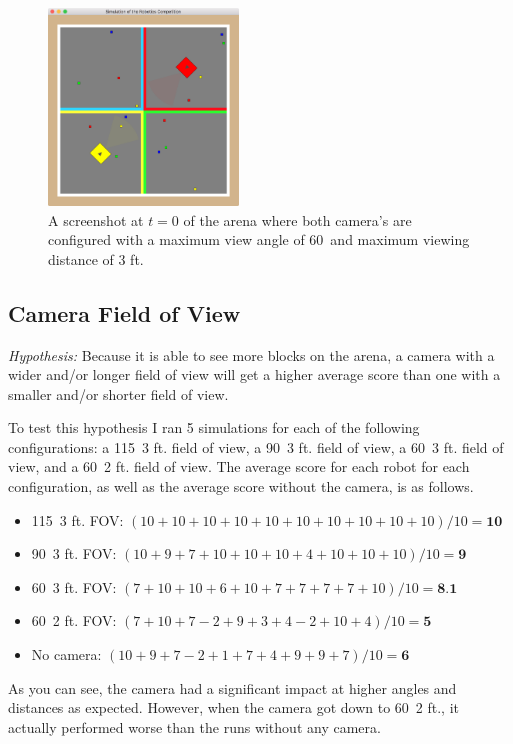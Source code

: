 \documentclass[12pt]{article}
\begin{document}
\begin{figure}[hbt]
  \center
  \includegraphics[width=0.45\textwidth]{images/arena-2.png}
  \caption{A screenshot at $t=0$ of the arena where both camera's are configured with a maximum view angle of 60\degree\ and maximum viewing distance of 3 ft.}
  \label{fig:arena-2}
\end{figure}

\subsection{Camera Field of View}
\textit{Hypothesis:} Because it is able to see more blocks on the arena, a camera with a wider and/or longer field of view will get a higher average score than one with a smaller and/or shorter field of view.

To test this hypothesis I ran 5 simulations for each of the following configurations: a 115\degree\ 3 ft. field of view, a 90\degree\ 3 ft. field of view, a 60\degree\ 3 ft. field of view, and a 60\degree\ 2 ft. field of view. The average score for each robot for each configuration, as well as the average score without the camera, is as follows.
\begin{itemize}
  \item 115\degree\ 3 ft. FOV: $(10+10+10+10+10+10+10+10+10+10)/10 = \textbf{10}$
  \item 90\degree\ 3 ft. FOV: $(10+9+7+10+10+10+4+10+10+10)/10 = \textbf{9}$
  \item 60\degree\ 3 ft. FOV: $(7+10+10+6+10+7+7+7+7+10)/10 = \textbf{8.1}$
  \item 60\degree\ 2 ft. FOV: $(7+10+7-2+9+3+4-2+10+4)/10 = \textbf{5}$
  \item No camera: $(10+9+7-2+1+7+4+9+9+7)/10 = \textbf{6}$
\end{itemize}

As you can see, the camera had a significant impact at higher angles and distances as expected. However, when the camera got down to 60\degree\ 2 ft., it actually performed worse than the runs without any camera.
\end{document}
